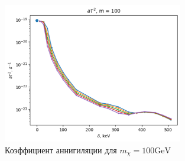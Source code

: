 \begin{figure}[!h]
	\centering
	\includegraphics[width=0.7\textwidth]{images/AnnCoeff.png}
	\caption{Коэффициент аннигиляции для $m_{\chi} = 100 \text{GeV}$}
\end{figure}